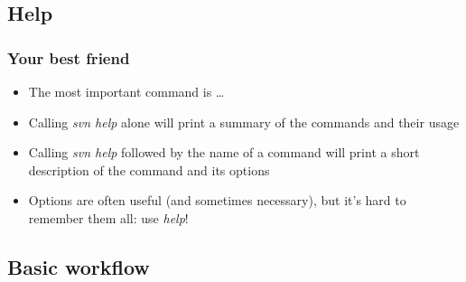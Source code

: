 \documentclass{beamer}
\begin{document}
\subsection{Help}

\frame
{
  \frametitle{Your best friend}
  
  \begin{itemize}
  \item<1-> The most important command is \dots
  		  \uncover<2->{\textit{help}}
  \item<3-> Calling \textit{svn help} alone will print a summary of the commands and their usage
  \item<4-> Calling \textit{svn help} followed by the name of a command will print a short description of the command and its options
  \item<5-> Options are often useful (and sometimes necessary), but it's hard to remember them all: use \textit{help}!
  \end{itemize}

}

\subsection{Basic workflow}
\end{document}
